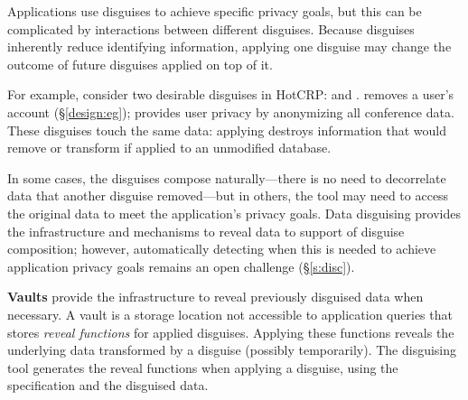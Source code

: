 Applications use disguises to achieve specific privacy goals, but this can be
complicated by interactions between different disguises.
%
Because disguises inherently reduce identifying information,
applying one disguise may change the outcome of future disguises applied on top of it.
%

%
For example, consider two desirable disguises in HotCRP: \gdpr and \ca.
%
\gdpr removes a user's account (\S\ref{design:eg}); \ca provides user privacy by
anonymizing all conference data.
%
These disguises touch the same data: applying \ca destroys information that \gdpr would
remove or transform if applied to an unmodified database.
%

%
In some cases, the disguises compose naturally---\eg there is no need to decorrelate
data that another disguise removed---but in others, the tool may need to access the
original data to meet the application's privacy goals.
%
%
Data disguising provides the infrastructure and mechanisms to reveal data to support
of disguise composition; however, automatically detecting when this is needed to
achieve application privacy goals remains an open challenge (\S\ref{s:disc}).


%
\textbf{Vaults} provide the infrastructure to reveal previously disguised data
when necessary.
%
A vault is a storage location not accessible to application queries that stores
\emph{reveal functions} for applied disguises.
%
Applying these functions reveals the underlying data transformed by a disguise
(possibly temporarily).
%
The disguising tool generates the reveal functions when applying a disguise, using
the specification and the disguised data.
%

